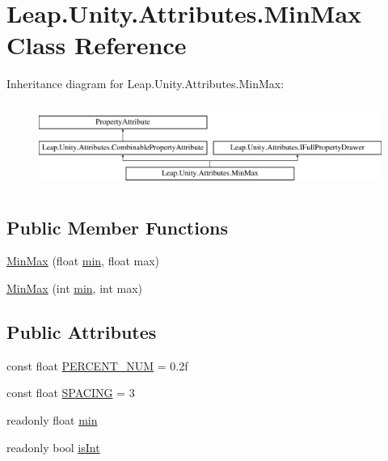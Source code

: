 \hypertarget{class_leap_1_1_unity_1_1_attributes_1_1_min_max}{}\section{Leap.\+Unity.\+Attributes.\+Min\+Max Class Reference}
\label{class_leap_1_1_unity_1_1_attributes_1_1_min_max}
Inheritance diagram for Leap.\+Unity.\+Attributes.\+Min\+Max\+:\begin{figure}[H]
\begin{center}
\leavevmode
\includegraphics[height=2.772277cm]{class_leap_1_1_unity_1_1_attributes_1_1_min_max}
\end{center}
\end{figure}
\subsection*{Public Member Functions}
\begin{DoxyCompactItemize}
\item 
\mbox{\hyperlink{class_leap_1_1_unity_1_1_attributes_1_1_min_max_a9ad8b6438b676075ee2eb0f39711f314}{Min\+Max}} (float \mbox{\hyperlink{class_leap_1_1_unity_1_1_attributes_1_1_min_max_a22aa1508f2e00332ff80a93c6e848a48}{min}}, float max)
\item 
\mbox{\hyperlink{class_leap_1_1_unity_1_1_attributes_1_1_min_max_a539ca33e10800a71f45d235644ba3d6c}{Min\+Max}} (int \mbox{\hyperlink{class_leap_1_1_unity_1_1_attributes_1_1_min_max_a22aa1508f2e00332ff80a93c6e848a48}{min}}, int max)
\end{DoxyCompactItemize}
\subsection*{Public Attributes}
\begin{DoxyCompactItemize}
\item 
const float \mbox{\hyperlink{class_leap_1_1_unity_1_1_attributes_1_1_min_max_a447204faf0d42cadd540e84a5e43c3e7}{P\+E\+R\+C\+E\+N\+T\+\_\+\+N\+UM}} = 0.\+2f
\item 
const float \mbox{\hyperlink{class_leap_1_1_unity_1_1_attributes_1_1_min_max_afc47897df4a1054f54fee1c5340050e5}{S\+P\+A\+C\+I\+NG}} = 3
\item 
readonly float \mbox{\hyperlink{class_leap_1_1_unity_1_1_attributes_1_1_min_max_a22aa1508f2e00332ff80a93c6e848a48}{min}}
\item 
readonly bool \mbox{\hyperlink{class_leap_1_1_unity_1_1_attributes_1_1_min_max_a167383ce241489a1637ad8dc577068a0}{is\+Int}}
\end{DoxyCompactItemize}
